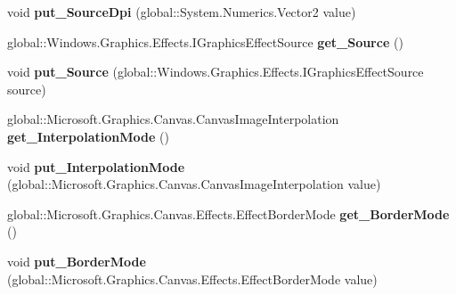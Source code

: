 \begin{DoxyCompactItemize}
void {\bfseries put\+\_\+\+Source\+Dpi} (global\+::\+System.\+Numerics.\+Vector2 value)
\item 
\mbox{\label{interface_microsoft_1_1_graphics_1_1_canvas_1_1_effects_1_1_i_dpi_compensation_effect_a9ae226af5c8b8a43bd821a1f03fe01e8}} 
global\+::\+Windows.\+Graphics.\+Effects.\+I\+Graphics\+Effect\+Source {\bfseries get\+\_\+\+Source} ()
\item 
\mbox{\label{interface_microsoft_1_1_graphics_1_1_canvas_1_1_effects_1_1_i_dpi_compensation_effect_a4a6c12a0c99192ed2bbc9a1efcbe0849}} 
void {\bfseries put\+\_\+\+Source} (global\+::\+Windows.\+Graphics.\+Effects.\+I\+Graphics\+Effect\+Source source)
\item 
\mbox{\label{interface_microsoft_1_1_graphics_1_1_canvas_1_1_effects_1_1_i_dpi_compensation_effect_ac5e4888783e519ac1ef3cca2949f28c8}} 
global\+::\+Microsoft.\+Graphics.\+Canvas.\+Canvas\+Image\+Interpolation {\bfseries get\+\_\+\+Interpolation\+Mode} ()
\item 
\mbox{\label{interface_microsoft_1_1_graphics_1_1_canvas_1_1_effects_1_1_i_dpi_compensation_effect_a9dc002b657a33313f9c1e53d96297e13}} 
void {\bfseries put\+\_\+\+Interpolation\+Mode} (global\+::\+Microsoft.\+Graphics.\+Canvas.\+Canvas\+Image\+Interpolation value)
\item 
\mbox{\label{interface_microsoft_1_1_graphics_1_1_canvas_1_1_effects_1_1_i_dpi_compensation_effect_a76445b947278b23789ac880d8cc5fc6a}} 
global\+::\+Microsoft.\+Graphics.\+Canvas.\+Effects.\+Effect\+Border\+Mode {\bfseries get\+\_\+\+Border\+Mode} ()
\item 
\mbox{\label{interface_microsoft_1_1_graphics_1_1_canvas_1_1_effects_1_1_i_dpi_compensation_effect_ade5071aec175affb5d564c3ff21ab872}} 
void {\bfseries put\+\_\+\+Border\+Mode} (global\+::\+Microsoft.\+Graphics.\+Canvas.\+Effects.\+Effect\+Border\+Mode value)

\end{DoxyCompactItemize}
